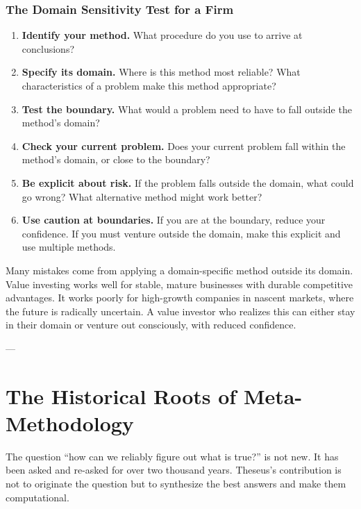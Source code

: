 \documentclass[11pt,letterpaper]{article}
\begin{document}
\subsubsection*{The Domain Sensitivity Test for a Firm}

\begin{enumerate}
  \item \textbf{Identify your method.} What procedure do you use to arrive at conclusions?
  \item \textbf{Specify its domain.} Where is this method most reliable? What characteristics of a problem make this method appropriate?
  \item \textbf{Test the boundary.} What would a problem need to have to fall outside the method's domain?
  \item \textbf{Check your current problem.} Does your current problem fall within the method's domain, or close to the boundary?
  \item \textbf{Be explicit about risk.} If the problem falls outside the domain, what could go wrong? What alternative method might work better?
  \item \textbf{Use caution at boundaries.} If you are at the boundary, reduce your confidence. If you must venture outside the domain, make this explicit and use multiple methods.
\end{enumerate}

Many mistakes come from applying a domain-specific method outside its domain. Value investing works well for stable, mature businesses with durable competitive advantages. It works poorly for high-growth companies in nascent markets, where the future is radically uncertain. A value investor who realizes this can either stay in their domain or venture out consciously, with reduced confidence.

---

\newpage


\section{The Historical Roots of Meta-Methodology}

The question ``how can we reliably figure out what is true?'' is not new. It has been asked and re-asked for over two thousand years. Theseus's contribution is not to originate the question but to synthesize the best answers and make them computational.
\end{document}
